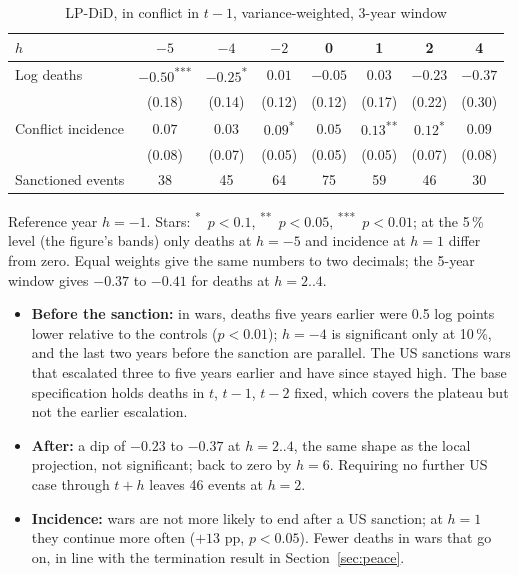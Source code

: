 \documentclass[11pt,a4paper]{article}
\newcommand{\sig}[1]{\textsuperscript{#1}}
\begin{document}
\begin{table}[H]
\centering\small
\caption{LP-DiD, in conflict in $t-1$, variance-weighted, 3-year window}
\label{tab:lpdid}
\begin{threeparttable}
\begin{tabular}{@{}lccccccc@{}}
\toprule
$h$ & $-5$ & $-4$ & $-2$ & 0 & 1 & 2 & 4 \\
\midrule
Log deaths & $-0.50$\sig{***} & $-0.25$\sig{*} & $0.01$ & $-0.05$ & $0.03$ & $-0.23$ & $-0.37$ \\
& (0.18) & (0.14) & (0.12) & (0.12) & (0.17) & (0.22) & (0.30) \\
Conflict incidence & $0.07$ & $0.03$ & $0.09$\sig{*} & $0.05$ & $0.13$\sig{**} & $0.12$\sig{*} & $0.09$ \\
& (0.08) & (0.07) & (0.05) & (0.05) & (0.05) & (0.07) & (0.08) \\
Sanctioned events & 38 & 45 & 64 & 75 & 59 & 46 & 30 \\
\bottomrule
\end{tabular}
\begin{tablenotes}\footnotesize
\item Reference year $h=-1$. Stars: \sig{*}~$p<0.1$, \sig{**}~$p<0.05$, \sig{***}~$p<0.01$; at the 5\,\% level
(the figure's bands) only deaths at $h=-5$ and incidence at $h=1$ differ from zero. Equal weights give the same
numbers to two decimals; the 5-year window gives $-0.37$ to $-0.41$ for deaths at $h=2..4$.
\end{tablenotes}
\end{threeparttable}
\end{table}

\begin{itemize}[leftmargin=*]
\item \textbf{Before the sanction:} in wars, deaths five years earlier were 0.5 log points lower relative to the
  controls ($p<0.01$); $h=-4$ is significant only at 10\,\%, and the last two years before the sanction are parallel.
  The US sanctions wars that escalated three to five years earlier and have since stayed high. The base
  specification holds deaths in $t$, $t-1$, $t-2$ fixed, which covers the plateau but not the earlier escalation.
\item \textbf{After:} a dip of $-0.23$ to $-0.37$ at $h=2..4$, the same shape as the local projection, not
  significant; back to zero by $h=6$. Requiring no further US case through $t+h$ leaves 46 events at $h=2$.
\item \textbf{Incidence:} wars are not more likely to end after a US sanction; at $h=1$ they continue more often
  ($+13$ pp, $p<0.05$). Fewer deaths in wars that go on, in line with the termination result in
  Section~\ref{sec:peace}.
\end{itemize}
\end{document}
